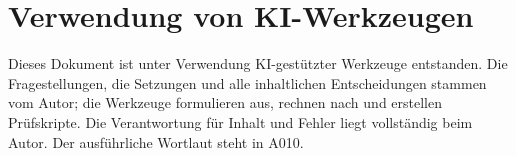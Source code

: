\section{Verwendung von KI-Werkzeugen}

Dieses Dokument ist unter Verwendung KI-gestützter Werkzeuge entstanden.
Die Fragestellungen, die Setzungen und alle inhaltlichen Entscheidungen
stammen vom Autor; die Werkzeuge formulieren aus, rechnen nach und erstellen
Prüfskripte. Die Verantwortung für Inhalt und Fehler liegt vollständig
beim Autor. Der ausführliche Wortlaut steht in A010.

